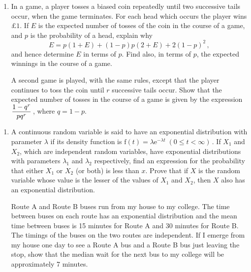 \documentclass[a4, 11pt]{report}
\newlength{\qspace}
\newcounter{qnumber}
\newenvironment{question}%
 {\vspace{\qspace}
  \begin{enumerate}[\bfseries 1\quad][10]%
    \setcounter{enumi}{\value{qnumber}}%
    \item%
 }
{
  \end{enumerate}
  \filbreak
  \stepcounter{qnumber}
 }
\def\e{{\mathrm e}}
\def\f{{\mathrm f}}
\def\le{\leqslant}
\def\l{\left(}
\def\r{\right)}
\begin{document}
\begin{question}
In a game, a player tosses a biased coin 
repeatedly until two successive tails occur, when the game terminates. 
For each head which occurs the player wins $\pounds 1$. 
If $E$ is the expected number of tosses of the 
coin in the course of a game, and $p$ is the probability of a head, explain why
\[
E = p \l 1 + E \r + \l 1 - p \r p \l 2 + E \r + 2 \l 1 - p \r ^2\,,
\]
and hence determine $E$ in terms of $p$. 
Find also, in terms of $p$, the expected winnings in the course of a game.

A second game is played, 
with the same rules, except that the player continues to 
toss the coin until $r$ successive tails occur. 
Show that the expected number of tosses in the 
course of a game is given by the expression 
$\displaystyle {1 - q^r \over p q^r}\,$, where $q = 1 - p$.

\end{question}

\begin{question}
A continuous random variable is said to have an exponential distribution 
with parameter $\lambda$ if its density function is 
$\f(t) = \lambda \e ^{- \lambda t} \; \l 0 \le t < \infty \r\,$. 
If $X_1$ and $X_2$, which are independent random variables, 
have exponential distributions with parameters $\lambda_1$ and $\lambda_2$ respectively, 
find an expression for the probability that either $X_1$ or $X_2$ (or both) 
is less than $x$. Prove that if $X$ is the random variable 
whose value is the lesser of the values of $X_1$ and $X_2$, 
then $X$ also has an exponential distribution.

Route A and Route B buses run from my house to my college. 
The time between buses on each route has an 
exponential distribution and the mean time between buses is 
15 minutes for Route A  and 30 minutes for Route B. 
The timings of the buses on the two routes are independent. 
If I emerge from my house one day to see a Route A bus 
and a Route B bus just leaving the stop, 
show that the median wait for the next bus to my college will be approximately 7 minutes.
\end{question}
\end{document}
